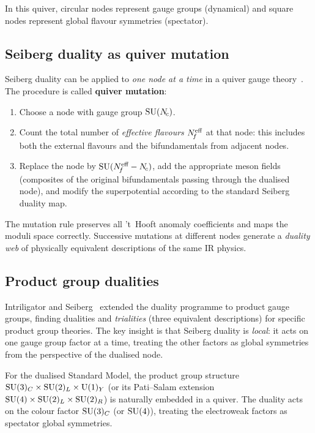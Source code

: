 \documentclass[11pt,a4paper]{article}
\begin{document}
In this quiver, circular nodes represent gauge groups (dynamical)
and square nodes represent global flavour symmetries (spectator).

\subsection{Seiberg duality as quiver mutation}

Seiberg duality can be applied to \emph{one node at a time} in a
quiver gauge theory~\cite{IS9506084}.  The procedure is called
\textbf{quiver mutation}:
\begin{enumerate}
  \item Choose a node with gauge group $\mathrm{SU}(N_{\!c})$.
  \item Count the total number of \emph{effective flavours}
    $N_{\!f}^{\text{eff}}$ at that node: this includes both the external
    flavours and the bifundamentals from adjacent nodes.
  \item Replace the node by $\mathrm{SU}(N_{\!f}^{\text{eff}} - N_{\!c})$, add
    the appropriate meson fields (composites of the original
    bifundamentals passing through the dualised node), and modify the
    superpotential according to the standard Seiberg duality map.
\end{enumerate}

The mutation rule preserves all 't~Hooft anomaly coefficients and
maps the moduli space correctly.  Successive mutations at different
nodes generate a \emph{duality web} of physically equivalent
descriptions of the same IR physics.

\subsection{Product group dualities}

Intriligator and Seiberg~\cite{IS9506084} extended the duality
programme to product gauge groups, finding dualities and
\emph{trialities} (three equivalent descriptions) for specific
product group theories.  The key insight is that Seiberg duality is
\emph{local}: it acts on one gauge group factor at a time, treating
the other factors as global symmetries from the perspective of the
dualised node.

For the dualised Standard Model, the product group structure
$\mathrm{SU}(3)_C \times \mathrm{SU}(2)_L \times \mathrm{U}(1)_Y$ (or its Pati--Salam
extension $\mathrm{SU}(4) \times \mathrm{SU}(2)_L \times \mathrm{SU}(2)_R$) is naturally
embedded in a quiver.  The duality acts on the colour factor
$\mathrm{SU}(3)_C$ (or $\mathrm{SU}(4)$), treating the electroweak factors as
spectator global symmetries.
\end{document}
